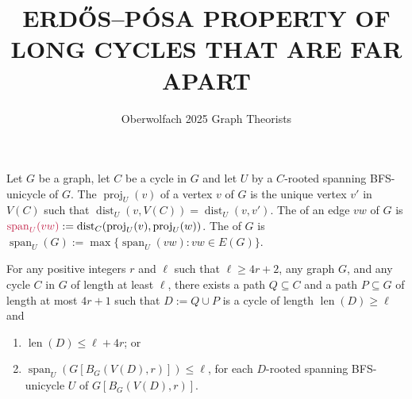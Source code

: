 \documentclass{patmorin}
\title{\MakeUppercase{{E}rdős–{P}ósa property of long cycles that are far apart}}
\author{%
  Oberwolfach 2025 Graph Theorists
}
\date{}
\DeclareMathOperator{\len}{len}
\DeclareMathOperator{\proj}{proj}
\DeclareMathOperator{\spn}{span}
\DeclareMathOperator{\dist}{dist}
\begin{document}
\maketitle



Let $G$ be a graph, let $C$ be a cycle in $G$ and let $U$ by a $C$-rooted spanning BFS-unicycle of $G$.  The  $\proj_U(v)$ of a vertex $v$ of $G$ is the unique vertex $v'$ in $V(C)$ such that $\dist_U(v,V(C))=\dist_U(v,v')$. The  of an edge $vw$ of $G$ is $\mathdefin{\spn_U(vw)}:=\dist_C(\proj_U(v),\proj_U(w))$.  The  of $G$ is $\spn_U(G):=\max\{\spn_U(vw):vw\in E(G)\}$.

\begin{lem}
  For any positive integers $r$ and $\ell$ such that $\ell \ge 4r+2$, any graph $G$, and any cycle $C$ in $G$ of length at least $\ell$, there exists a path $Q\subseteq C$ and a path $P\subseteq G$ of length at most $4r+1$ such that $D:=Q\cup P$ is a cycle of length $\len(D)\ge\ell$ and
  \begin{enumerate}[nosep,nolistsep,label=\rm(\alph*),ref=(\alph*)]
    \item\label{medium_cycle} $\len(D) \le \ell+4r$; or
    \item\label{tighty} $\spn_U(G[B_G(V(D),r)])\le\ell$, for each $D$-rooted spanning BFS-unicycle $U$ of $G[B_G(V(D),r)]$.
  \end{enumerate}
\end{lem}
\end{document}
